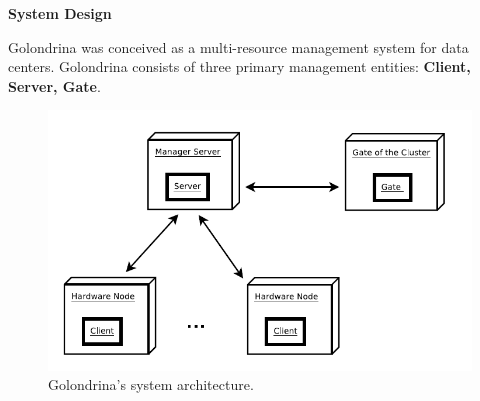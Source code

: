 \documentclass[12pt]{article} %
\begin{document}
\textbf{System Design} 


Golondrina was conceived as a multi-resource management system for data centers. Golondrina consists of three primary management entities: \textbf{Client, Server, Gate}.

\begin{figure}[h!]
  \centering
   \includegraphics[scale=0.50]{Golondrina.png}
  \caption{Golondrina's system architecture.}
\end{figure}
\end{document}
